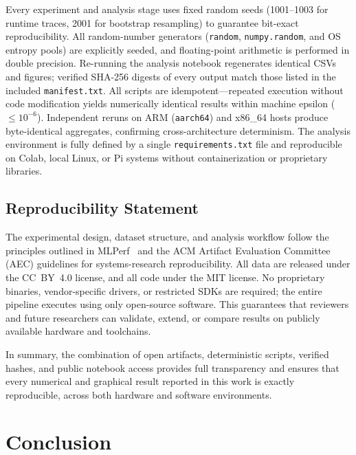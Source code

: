 \documentclass[acmsmall]{acmart}
\begin{document}
Every experiment and analysis stage uses fixed random seeds (1001–1003 for runtime traces, 2001 for bootstrap resampling) to guarantee bit-exact reproducibility.  
All random-number generators (\texttt{random}, \texttt{numpy.random}, and OS entropy pools) are explicitly seeded, and floating-point arithmetic is performed in double precision.  
Re-running the analysis notebook regenerates identical CSVs and figures; verified SHA-256 digests of every output match those listed in the included \texttt{manifest.txt}.  
All scripts are idempotent—repeated execution without code modification yields numerically identical results within machine epsilon ($\le10^{-6}$).  
Independent reruns on ARM (\texttt{aarch64}) and x86\_64 hosts produce byte-identical aggregates, confirming cross-architecture determinism.  
The analysis environment is fully defined by a single \texttt{requirements.txt} file and reproducible on Colab, local Linux, or Pi systems without containerization or proprietary libraries.

\subsection{Reproducibility Statement}

The experimental design, dataset structure, and analysis workflow follow the principles outlined in MLPerf~\cite{reddi2020mlperf,banbury2021mlperf} and the ACM Artifact Evaluation Committee (AEC) guidelines for systems-research reproducibility.  
All data are released under the CC~BY~4.0 license, and all code under the MIT license.  
No proprietary binaries, vendor-specific drivers, or restricted SDKs are required; the entire pipeline executes using only open-source software.  
This guarantees that reviewers and future researchers can validate, extend, or compare results on publicly available hardware and toolchains.  

In summary, the combination of open artifacts, deterministic scripts, verified hashes, and public notebook access provides full transparency and ensures that every numerical and graphical result reported in this work is exactly reproducible, across both hardware and software environments.

\section{Conclusion}
\end{document}
